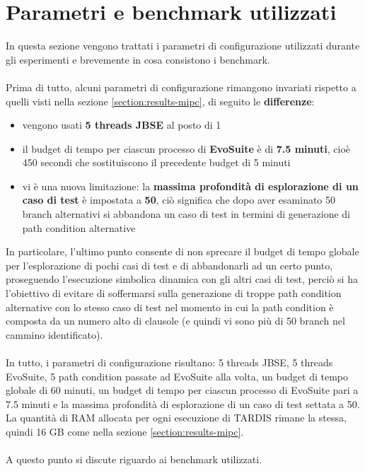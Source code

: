 \documentclass[a4paper, 12pt, oneside]{book}
\theoremstyle{normal}
\begin{document}
\section{Parametri e benchmark utilizzati}
In questa sezione vengono trattati i parametri di configurazione utilizzati durante gli esperimenti e brevemente in cosa consistono i benchmark.
\\ \\ Prima di tutto, alcuni parametri di configurazione rimangono invariati rispetto a quelli visti nella sezione \ref{section:results-mipc}, di seguito le \textbf{differenze}:
\begin{itemize}[itemsep=0pt, topsep=2pt]
    \item vengono usati \textbf{5 threads JBSE} al posto di 1
    \item il budget di tempo per ciascun processo di \textbf{EvoSuite} è di \textbf{7.5 minuti}, cioè 450 secondi che sostituiscono il precedente budget di 5 minuti
    \item vi è una nuova limitazione: la \textbf{massima profondità di esplorazione di un caso di test} è impostata a \textbf{50}, ciò significa che dopo aver esaminato 50 branch alternativi si abbandona un caso di test in termini di generazione di path condition alternative
\end{itemize}
\clearpage \noindent In particolare, l'ultimo punto consente di non sprecare il budget di tempo globale per l'esplorazione di pochi casi di test e di abbandonarli ad un certo punto, proseguendo l'esecuzione simbolica dinamica con gli altri casi di test, perciò si ha l'obiettivo di evitare di soffermarsi sulla generazione di troppe path condition alternative con lo stesso caso di test nel momento in cui la path condition è composta da un numero alto di clausole (e quindi vi sono più di 50 branch nel cammino identificato).
\\ \\ In tutto, i parametri di configurazione risultano: 5 threads JBSE, 5 threads EvoSuite, 5 path condition passate ad EvoSuite alla volta, un budget di tempo globale di 60 minuti, un budget di tempo per ciascun processo di EvoSuite pari a 7.5 minuti e la massima profondità di esplorazione di un caso di test settata a 50. 
\\ La quantità di RAM allocata per ogni esecuzione di TARDIS rimane la stessa, quindi 16 GB come nella sezione \ref{section:results-mipc}.
\\ \\ A questo punto si discute riguardo ai benchmark utilizzati. 
\end{document}
